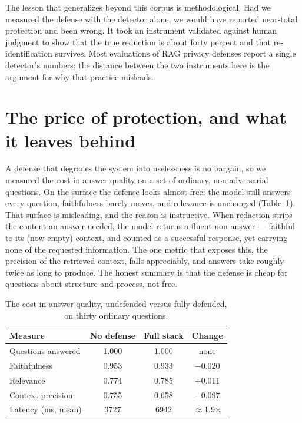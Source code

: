\documentclass[11pt,a4paper]{article}
\begin{document}
The lesson that generalizes beyond this corpus is methodological. Had we measured the defense with the
detector alone, we would have reported near-total protection and been wrong. It took an instrument
validated against human judgment to show that the true reduction is about forty percent and that
re-identification survives. Most evaluations of RAG privacy defenses report a single detector's
numbers; the distance between the two instruments here is the argument for why that practice misleads.

\section{The price of protection, and what it leaves behind}
\label{sec:cost}

A defense that degrades the system into uselessness is no bargain, so we measured the cost in answer
quality on a set of ordinary, non-adversarial questions. On the surface the defense looks almost free:
the model still answers every question, faithfulness barely moves, and relevance is unchanged
(Table~\ref{tab:utility}). That surface is misleading, and the reason is instructive. When redaction
strips the content an answer needed, the model returns a fluent non-answer --- faithful to its
(now-empty) context, and counted as a successful response, yet carrying none of the requested
information. The one metric that exposes this, the precision of the retrieved context, falls
appreciably, and answers take roughly twice as long to produce. The honest summary is that the defense
is cheap for questions about structure and process, not free.

\begin{table}[h]
\centering
\caption{The cost in answer quality, undefended versus fully defended, on thirty ordinary questions.}
\label{tab:utility}
\begin{tabular}{lccc}
\toprule
\textbf{Measure} & \textbf{No defense} & \textbf{Full stack} & \textbf{Change}\\
\midrule
Questions answered & 1.000 & 1.000 & none\\
Faithfulness & 0.953 & 0.933 & $-0.020$\\
Relevance & 0.774 & 0.785 & $+0.011$\\
Context precision & 0.755 & 0.658 & \textbf{$-0.097$}\\
Latency (ms, mean) & 3727 & 6942 & $\approx$1.9$\times$\\
\bottomrule
\end{tabular}
\end{table}
\end{document}
